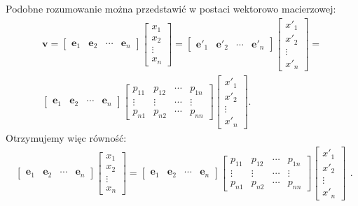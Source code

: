 \documentclass{article}
\begin{document}
Podobne rozumowanie można przedstawić w postaci wektorowo macierzowej:
$$
\begin{array}{c}
\mathbf{v}
=
\begin{bmatrix} \mathbf{e}_{1} & \mathbf{e}_{2} & \cdots & \mathbf{e}_{n} \end{bmatrix}
\begin{bmatrix} x_{1} \\ x_{2} \\ \vdots \\ x_{n} \end{bmatrix} 
=
\begin{bmatrix} \mathbf{e}'_{1} & \mathbf{e}'_{2} & \cdots & \mathbf{e}'_{n} \end{bmatrix}
\begin{bmatrix} x'_{1} \\ x'_{2} \\ \vdots \\ x'_{n} \end{bmatrix} 
=
\\
\begin{bmatrix} \mathbf{e}_{1} & \mathbf{e}_{2} & \cdots & \mathbf{e}_{n} \end{bmatrix}
\begin{bmatrix}
    p_{11} & p_{12} & \cdots & p_{1n}\\
    \vdots & \vdots & \cdots & \vdots\\
    p_{n1} & p_{n2} & \cdots & p_{nn}
\end{bmatrix}
\begin{bmatrix} x'_{1} \\ x'_{2} \\ \vdots \\ x'_{n} \end{bmatrix}.
\end{array}
$$
Otrzymujemy więc równość:
$$
\begin{array}{c}
\begin{bmatrix} \mathbf{e}_{1} & \mathbf{e}_{2} & \cdots & \mathbf{e}_{n} \end{bmatrix}
\begin{bmatrix} x_{1} \\ x_{2} \\ \vdots \\ x_{n} \end{bmatrix} 
=
\begin{bmatrix} \mathbf{e}_{1} & \mathbf{e}_{2} & \cdots & \mathbf{e}_{n} \end{bmatrix}
\begin{bmatrix}
    p_{11} & p_{12} & \cdots & p_{1n}\\
    \vdots & \vdots & \cdots & \vdots\\
    p_{n1} & p_{n2} & \cdots & p_{nn}
\end{bmatrix}
\begin{bmatrix} x'_{1} \\ x'_{2} \\ \vdots \\ x'_{n} \end{bmatrix} 
\end{array}.
$$
\end{document}
